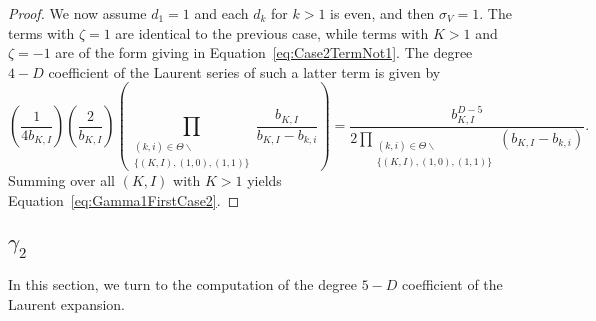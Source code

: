 \documentclass{amsart}
\theoremstyle{definition}
\theoremstyle{remark}
\begin{document}
\begin{proof}
We now assume $d_1 = 1$ and each $d_k$ for $k > 1$ is even, and then $\sigma_V = 1$. The terms with $\zeta = 1$ are
identical to the previous case, while terms with $K > 1$ and $\zeta = -1$ are of the form giving in
Equation~\eqref{eq:Case2TermNot1}. The degree $4-D$ coefficient of the Laurent series of such a latter
term is given by
\[
    \left(
    \frac{1}{ 4 b_{K,I} }
    \right)
    \left(
    \frac{2}{ b_{K,I} }
    \right)
    \left(
    \prod\limits_{\substack{(k,i)\in\Theta\smallsetminus \\ \{ (K,I), (1,0), (1,1) \} }}
        \frac{ b_{K,I} }{ b_{K,I}-b_{k,i} }
    \right)
    =
    \frac{ b_{K,I}^{D-5} }
        { 2 \prod\limits_{\substack{(k,i)\in\Theta\smallsetminus \\ \{ (K,I), (1,0), (1,1) \} }}
            (b_{K,I}-b_{k,i})}.
\]
Summing over all $(K,I)$ with $K > 1$ yields Equation~\eqref{eq:Gamma1FirstCase2}.
\end{proof}


\subsection{$\gamma_2$}
\label{subsec:LaurentGamma2First}

In this section, we turn to the computation of the degree $5-D$ coefficient of the Laurent expansion.
\end{document}
